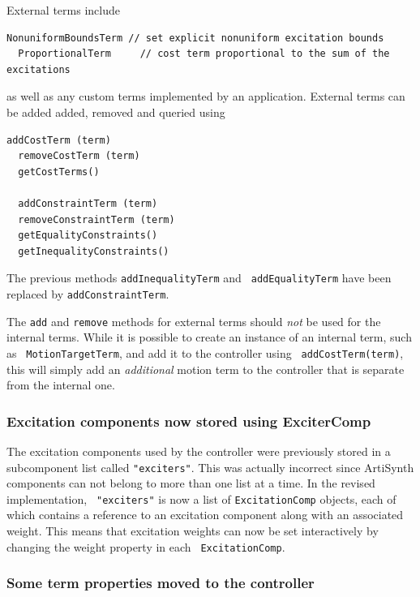 \documentclass{article}
\begin{document}
External terms include
\begin{lstlisting}[]
  NonuniformBoundsTerm // set explicit nonuniform excitation bounds
  ProportionalTerm     // cost term proportional to the sum of the excitations
\end{lstlisting}
%
as well as any custom terms implemented by an application. External
terms can be added added, removed and queried using
%
\begin{lstlisting}[]
  addCostTerm (term)
  removeCostTerm (term)
  getCostTerms()

  addConstraintTerm (term)
  removeConstraintTerm (term)
  getEqualityConstraints()
  getInequalityConstraints()
\end{lstlisting}
%

\begin{sideblock}
The previous methods {\tt addInequalityTerm} and {\tt
addEqualityTerm} have been replaced by {\tt addConstraintTerm}.
\end{sideblock}

\begin{sideblock}
The {\tt add} and {\tt remove} methods for external
terms should {\it not} be used for the internal terms. While it is
possible to create an instance of an internal term, such as {\tt
MotionTargetTerm}, and add it to the controller using {\tt
addCostTerm(term)}, this will simply add an {\it additional} motion
term to the controller that is separate from the internal one.
\end{sideblock}

\subsubsection*{Excitation components now stored using ExciterComp}

The excitation components used by the controller were previously
stored in a subcomponent list called {\tt "exciters"}. This was
actually incorrect since ArtiSynth components can not belong to more
than one list at a time.  In the revised implementation, {\tt
"exciters"} is now a list of {\tt ExcitationComp} objects, each of
which contains a reference to an excitation component along with an
associated weight. This means that excitation weights can now be set
interactively by changing the {\sf weight} property in each {\tt
ExcitationComp}.

\subsubsection*{Some term properties moved to the controller}
\end{document}
